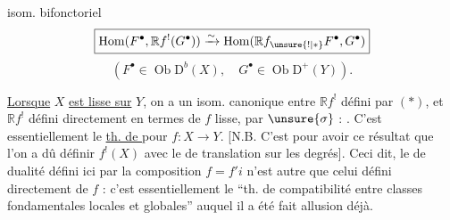 isom. bifonctoriel
\[
\boxed{\operatorname{Hom}(F^\bullet,\mathbb{R}f^!(G^\bullet))
\xrightarrow{\sim}
\operatorname{Hom}(\mathbb{R}f_{\unsure{!|*}}F^\bullet,G^\bullet)}
\]
\[
(F^\bullet\in\operatorname{Ob}\mathrm D^b(X),\quad G^\bullet\in\operatorname{Ob}\mathrm D^+(Y)).
\]

\uline{Lorsque} $X$ \uline{est lisse sur} $Y$, on a un isom. canonique entre $\mathbb{R}f^!$ défini par $(*)$, et $\mathbb{R}f^!$ défini directement en termes de $f$ lisse,  par $\unsure{\sigma}$ : .
C'est essentiellement le \uline{th. de } pour $f:X\longrightarrow Y$.
[N.B. C'est pour avoir ce résultat que l'on a dû définir $f^!(X)$ avec le  de translation sur les degrés\unsure{\ldots}].
Ceci dit, le  de dualité défini ici par la composition $f=f'i$ n'est autre que celui défini directement   de $f$ : c'est essentiellement le ``th. de compatibilité entre classes fondamentales locales et globales'' auquel il a été fait allusion déjà.
